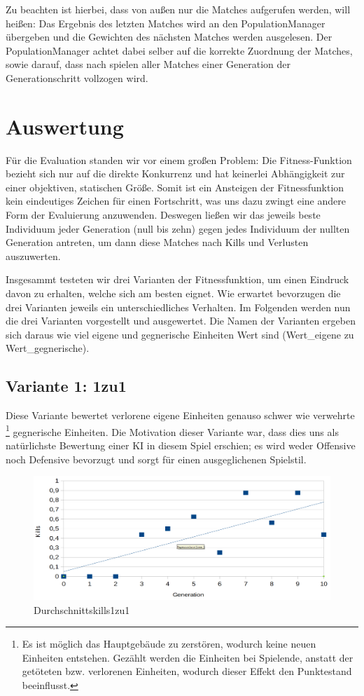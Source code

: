 \documentclass[
	12pt,
	a4paper,
	BCOR10mm,
	DIV14,
	headsepline,
	usegeometry,
]{scrreprt}
\begin{document}
Zu beachten ist hierbei, dass von außen nur die Matches aufgerufen werden, will heißen: Das Ergebnis des letzten Matches wird an den PopulationManager übergeben und die Gewichten des nächsten Matches werden ausgelesen.
Der PopulationManager achtet dabei selber auf die korrekte Zuordnung der Matches, sowie darauf, dass nach spielen aller Matches einer Generation der Generationschritt vollzogen wird.

\chapter{Auswertung}
\label{Auswertung}
Für die Evaluation standen wir vor einem großen Problem: Die Fitness-Funktion bezieht sich nur auf die direkte Konkurrenz und hat keinerlei Abhängigkeit zur einer objektiven, statischen Größe.
Somit ist ein Ansteigen der Fitnessfunktion kein eindeutiges Zeichen für einen Fortschritt, was uns dazu zwingt eine andere Form der Evaluierung anzuwenden.
Deswegen ließen wir das jeweils beste Individuum jeder Generation (null bis zehn) gegen jedes Individuum der nullten Generation antreten, um dann diese Matches nach Kills und Verlusten auszuwerten.

Insgesammt testeten wir drei Varianten der Fitnessfunktion, um einen Eindruck davon zu erhalten, welche sich am besten eignet.
Wie erwartet bevorzugen die drei Varianten jeweils ein unterschiedliches Verhalten.
Im Folgenden werden nun die drei Varianten vorgestellt und ausgewertet. Die Namen der Varianten ergeben sich daraus wie viel eigene und gegnerische Einheiten Wert sind (Wert\_eigene zu Wert\_gegnerische).

\section{Variante 1: 1zu1}
Diese Variante bewertet verlorene eigene Einheiten genauso schwer wie verwehrte \footnote{Es ist möglich das Hauptgebäude zu zerstören, wodurch keine neuen Einheiten entstehen.
Gezählt werden die Einheiten bei Spielende, anstatt der getöteten bzw. verlorenen Einheiten, wodurch dieser Effekt den Punktestand beeinflusst.} gegnerische Einheiten.
Die Motivation dieser Variante war, dass dies uns als natürlichste Bewertung einer KI in diesem Spiel erschien; es wird weder Offensive noch Defensive bevorzugt und sorgt für einen ausgeglichenen Spielstil.

\begin{figure}[h]
	\includegraphics[width = \textwidth]{Durchschnittskills1zu1.png}
	\caption{Durchschnittskills1zu1}
	\label{Durchschnittskills1zu1}
\end{figure}
\end{document}
